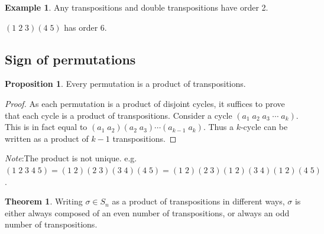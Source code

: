 \documentclass[a4paper]{article}
\theoremstyle{definition}
\newtheorem*{prop}{Proposition}
\newtheorem*{thm}{Theorem}
\newtheorem*{eg}{Example}
\newcommand{\note}{\noindent \emph{Note}:\;}
\begin{document}
\begin{eg}
  Any transpositions and double transpositions have order 2.

  $(1\; 2\; 3)(4\; 5)$ has order 6.
\end{eg}

\subsection{Sign of permutations}
\begin{prop}
  Every permutation is a product of transpositions.
\end{prop}

\begin{proof}
  As each permutation is a product of disjoint cycles, it suffices to prove that each cycle is a product of transpositions. Consider a cycle $(a_1\; a_2\; a_3\; \cdots\; a_k)$. This is in fact equal to $(a_1\; a_2)(a_2\; a_3)\cdots (a_{k-1}\; a_k)$. Thus a $k$-cycle can be written as a product of $k - 1$ transpositions.
\end{proof}

\note The product is not unique. e.g. $(1\; 2\; 3\; 4\; 5) =(1\; 2)(2\; 3)(3\; 4)(4\; 5) = (1\; 2)(2\; 3)(1\; 2)(3\; 4)(1\; 2)(4\; 5)$.

\begin{thm}
  Writing $\sigma\in S_n$ as a product of transpositions in different ways, $\sigma$ is either always composed of an even number of transpositions, or always an odd number of transpositions.
\end{thm}
\end{document}
